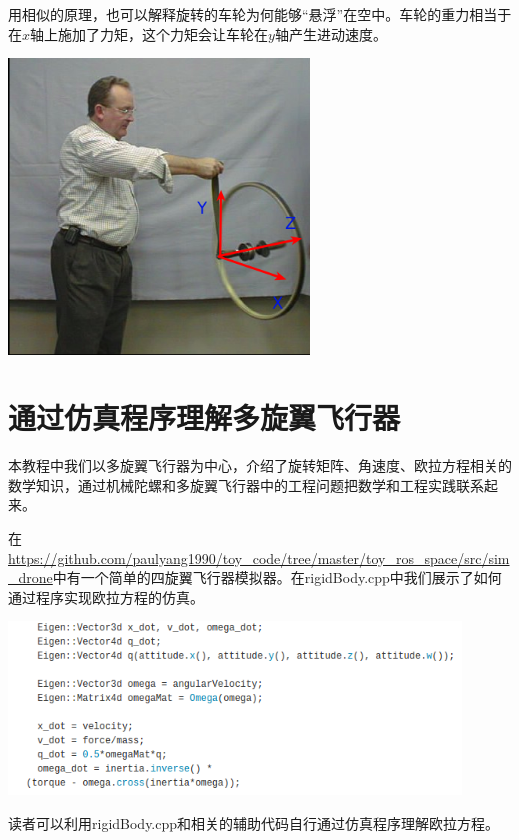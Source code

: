 \documentclass[11pt]{article}
\begin{document}
用相似的原理，也可以解释旋转的车轮为何能够“悬浮”在空中。车轮的重力相当于在$x$轴上施加了力矩，这个力矩会让车轮在$y$轴产生进动速度。
\begin{center}
\includegraphics[width=0.6\textwidth]{images/BicycleWheelGyro1.png}
\end{center}

\section{通过仿真程序理解多旋翼飞行器}
本教程中我们以多旋翼飞行器为中心，介绍了旋转矩阵、角速度、欧拉方程相关的数学知识，通过机械陀螺和多旋翼飞行器中的工程问题把数学和工程实践联系起来。

在\url{https://github.com/paulyang1990/toy_code/tree/master/toy_ros_space/src/sim_drone}中有一个简单的四旋翼飞行器模拟器。在rigidBody.cpp中我们展示了如何通过程序实现欧拉方程的仿真。

\begin{center}
\includegraphics[width=0.9\textwidth]{images/code.png}
\end{center}

读者可以利用rigidBody.cpp和相关的辅助代码自行通过仿真程序理解欧拉方程。


\end{document}
